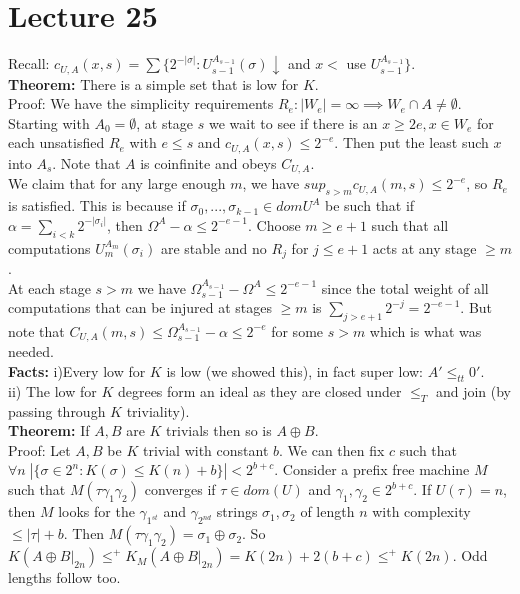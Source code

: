 \documentclass{article}
\begin{document}
  \section{Lecture 25}
  Recall: $c_{U,A}(x,s) = \sum \{2^{-|\sigma|} : U_{s-1}^{A_{s-1}}(\sigma)\downarrow$ and $x < $ use $U_{s-1}^{A_{s-1}}\}$.\\
  \textbf{Theorem:} There is a simple set that is low for $K$. \\
  Proof: We have the simplicity requirements $R_e : |W_e| = \infty \implies W_e\cap A \neq \emptyset$. Starting with $A_0 = \emptyset$, at stage $s$ we wait to see if there is an $x\geq 2e, x \in W_e$ for each unsatisfied $R_e$ with $e \leq s$ and $c_{U,A}(x,s) \leq 2^{-e}$. Then put the least such $x$ into $A_s$. Note that $A$ is coinfinite and obeys $C_{U,A}$.
   \\We claim that for any large enough $m$, we have $sup_{s> m} c_{U,A}(m,s) \leq 2^{-e}$, so $R_e$ is satisfied. This is because if $\sigma_0,...,\sigma_{k-1} \in dom U^A$ be such that if $\alpha = \sum_{i<k} 2^{-|\sigma_i|}$, then $\Omega^A - \alpha \leq 2^{-e-1}$. Choose $m \geq e+1$ such that all computations $U^{A_m}_m(\sigma_i)$ are stable and no $R_j$ for $j \leq e+1$ acts at any stage $\geq m$.\\
   At each stage $s> m$ we have $\Omega_{s-1}^{A_{s-1}} - \Omega^A \leq 2^{-e-1}$ since the total weight of all computations that can be injured at stages $\geq m$ is $\sum_{j > e+1} 2^{-j}= 2^{-e-1}$. But note that $C_{U,A}(m,s) \leq \Omega_{s-1}^{A_{s-1}}- \alpha \leq 2^{-e}$ for some $s>m$ which is what was needed.\\
   \textbf{Facts:} 
   i)Every low for $K$ is low (we showed this), in fact super low: $A' \leq_{tt} 0'$.\\
   ii) The low for $K$ degrees form an ideal as they are closed under $\leq_T$ and join (by passing through $K$ triviality).
   \\ \textbf{Theorem:} If $A, B$ are $K$ trivials then so is $A \oplus B$. \\
   Proof: Let $A,B$ be $K$ trivial with constant $b$. We can then fix $c$ such that $\forall n \; |\{\sigma \in 2^n: K(\sigma) \leq K(n)+b\}| < 2^{b+c}$. Consider a prefix free machine $M$ such that $M(\tau \gamma_1 \gamma_2)$ converges if $\tau \in dom(U)$ and $\gamma_1,\gamma_2 \in 2^{b+c}$. If $U(\tau) = n$, then $M$ looks for the $\gamma_{1^{st}}$ and $\gamma_{2^{nd}}$ strings $\sigma_1,\sigma_2$  of length $n$ with complexity $\leq |\tau| +b$. Then $M(\tau \gamma_1 \gamma_2) = \sigma_1 \oplus \sigma_2$. So $K(A \oplus B|_{2n}) \leq^+ K_M(A\oplus B|_{2n}) = K(2n) +2(b+c) \leq^+ K(2n)$. Odd lengths follow too.\\
   
\end{document}
